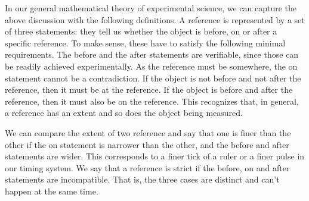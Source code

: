 \documentclass[11pt,letterpaper,fleqn]{memoir} %
\begin{document}
In our general mathematical theory of experimental science, we can capture the above discussion with the following definitions. A reference is represented by a set of three statements: they tell us whether the object is before, on or after a specific reference. To make sense, these have to satisfy the following minimal requirements. The before and the after statements are verifiable, since those can be readily achieved experimentally. As the reference must be somewhere, the on statement cannot be a contradiction. If the object is not before and not after the reference, then it must be at the reference. If the object is before and after the reference, then it must also be on the reference. This recognizes that, in general, a reference has an extent and so does the object being measured.

We can compare the extent of two reference and say that one is finer than the other if the on statement is narrower than the other, and the before and after statements are wider. This corresponds to a finer tick of a ruler or a finer pulse in our timing system. We say that a reference is strict if the before, on and after statements are incompatible. That is, the three cases are distinct and can't happen at the same time.
\end{document}
